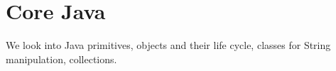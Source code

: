 \section{Core Java}

We look into Java primitives, objects and their life cycle, classes for String manipulation, collections. 









